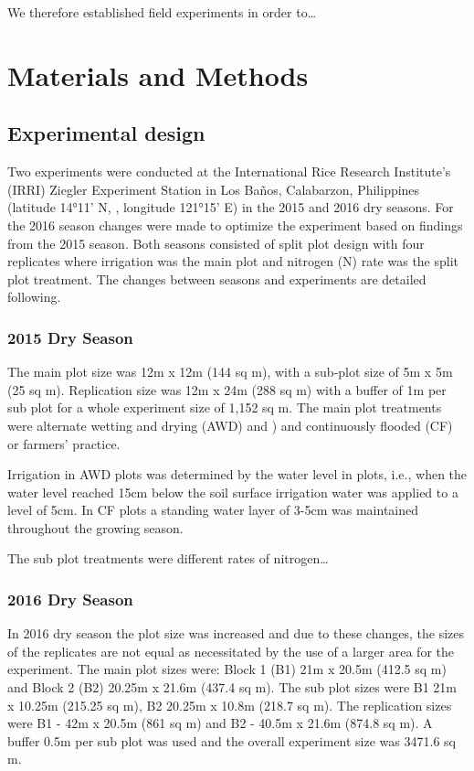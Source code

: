 \documentclass[10pt,letterpaper]{article}
\begin{document}
We therefore established field experiments in order to\ldots{}

\section{Materials and Methods}\label{materials-and-methods}

\subsection{Experimental design}\label{experimental-design}

Two experiments were conducted at the International Rice Research
Institute's (IRRI) Ziegler Experiment Station in Los Baños, Calabarzon,
Philippines (latitude 14°11' N, , longitude 121°15' E) in the 2015 and
2016 dry seasons. For the 2016 season changes were made to optimize the
experiment based on findings from the 2015 season. Both seasons
consisted of split plot design with four replicates where irrigation was
the main plot and nitrogen (N) rate was the split plot treatment. The
changes between seasons and experiments are detailed following.

\subsubsection{2015 Dry Season}\label{dry-season}

The main plot size was 12m x 12m (144 sq m), with a sub-plot size of 5m
x 5m (25 sq m). Replication size was 12m x 24m (288 sq m) with a buffer
of 1m per sub plot for a whole experiment size of 1,152 sq m. The main
plot treatments were alternate wetting and drying (AWD) and ) and
continuously flooded (CF) or farmers' practice.

Irrigation in AWD plots was determined by the water level in plots,
i.e., when the water level reached 15cm below the soil surface
irrigation water was applied to a level of 5cm. In CF plots a standing
water layer of 3-5cm was maintained throughout the growing season.

The sub plot treatments were different rates of nitrogen\ldots{}

\subsubsection{2016 Dry Season}\label{dry-season-1}

In 2016 dry season the plot size was increased and due to these changes,
the sizes of the replicates are not equal as necessitated by the use of
a larger area for the experiment. The main plot sizes were: Block 1 (B1)
21m x 20.5m (412.5 sq m) and Block 2 (B2) 20.25m x 21.6m (437.4 sq m).
The sub plot sizes were B1 21m x 10.25m (215.25 sq m), B2 20.25m x 10.8m
(218.7 sq m). The replication sizes were B1 - 42m x 20.5m (861 sq m) and
B2 - 40.5m x 21.6m (874.8 sq m). A buffer 0.5m per sub plot was used and
the overall experiment size was 3471.6 sq m.
\end{document}
